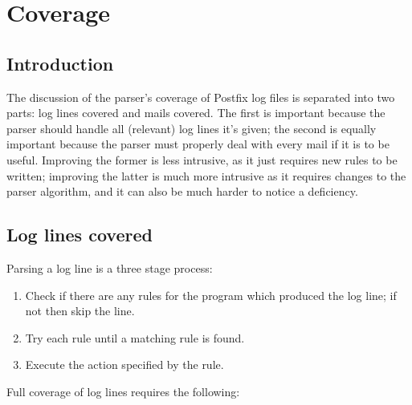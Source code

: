 \documentclass[a4paper,12pt,draft]{article}
\begin{document}
\section{Coverage}

\label{parsing coverage}

\subsection{Introduction}

The discussion of the parser's coverage of Postfix log files is separated
into two parts: log lines covered and mails covered.  The first is
important because the parser should handle all (relevant) log lines it's
given; the second is equally important because the parser must properly
deal with every mail if it is to be useful.  Improving the former is
less intrusive, as it just requires new rules to be written; improving the
latter is much more intrusive as it requires changes to the parser
algorithm, and it can also be much harder to notice a deficiency.

\subsection{Log lines covered}

\label{log-lines-covered}

Parsing a log line is a three stage process:

\begin{enumerate}

    \item Check if there are any rules for the program which produced the
        log line; if not then skip the line.  

    \item Try each rule until a matching rule is found.

    \item Execute the action specified by the rule.

\end{enumerate}

Full coverage of log lines requires the following:
\end{document}
